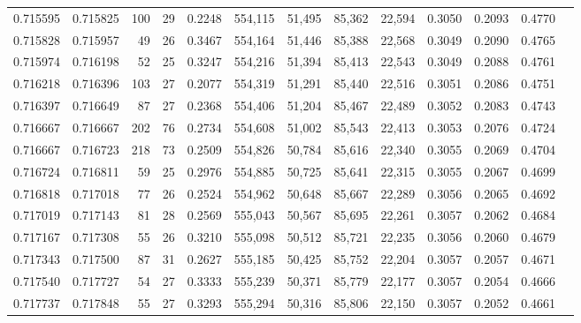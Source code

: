 \begin{tabular}{rrrrrrrrrrrrr}
0.715595 & 0.715825 &    100 &    29 &                                     0.2248 & 554,115 &  51,495 &  85,362 &  22,594 & 0.3050 & 0.2093 & 0.4770 \\
0.715828 & 0.715957 &     49 &    26 &                                     0.3467 & 554,164 &  51,446 &  85,388 &  22,568 & 0.3049 & 0.2090 & 0.4765 \\
0.715974 & 0.716198 &     52 &    25 &                                     0.3247 & 554,216 &  51,394 &  85,413 &  22,543 & 0.3049 & 0.2088 & 0.4761 \\
0.716218 & 0.716396 &    103 &    27 &                                     0.2077 & 554,319 &  51,291 &  85,440 &  22,516 & 0.3051 & 0.2086 & 0.4751 \\
0.716397 & 0.716649 &     87 &    27 &                                     0.2368 & 554,406 &  51,204 &  85,467 &  22,489 & 0.3052 & 0.2083 & 0.4743 \\
0.716667 & 0.716667 &    202 &    76 &                                     0.2734 & 554,608 &  51,002 &  85,543 &  22,413 & 0.3053 & 0.2076 & 0.4724 \\
0.716667 & 0.716723 &    218 &    73 &                                     0.2509 & 554,826 &  50,784 &  85,616 &  22,340 & 0.3055 & 0.2069 & 0.4704 \\
0.716724 & 0.716811 &     59 &    25 &                                     0.2976 & 554,885 &  50,725 &  85,641 &  22,315 & 0.3055 & 0.2067 & 0.4699 \\
0.716818 & 0.717018 &     77 &    26 &                                     0.2524 & 554,962 &  50,648 &  85,667 &  22,289 & 0.3056 & 0.2065 & 0.4692 \\
0.717019 & 0.717143 &     81 &    28 &                                     0.2569 & 555,043 &  50,567 &  85,695 &  22,261 & 0.3057 & 0.2062 & 0.4684 \\
0.717167 & 0.717308 &     55 &    26 &                                     0.3210 & 555,098 &  50,512 &  85,721 &  22,235 & 0.3056 & 0.2060 & 0.4679 \\
0.717343 & 0.717500 &     87 &    31 &                                     0.2627 & 555,185 &  50,425 &  85,752 &  22,204 & 0.3057 & 0.2057 & 0.4671 \\
0.717540 & 0.717727 &     54 &    27 &                                     0.3333 & 555,239 &  50,371 &  85,779 &  22,177 & 0.3057 & 0.2054 & 0.4666 \\
0.717737 & 0.717848 &     55 &    27 &                                     0.3293 & 555,294 &  50,316 &  85,806 &  22,150 & 0.3057 & 0.2052 & 0.4661 \\

\end{tabular}
